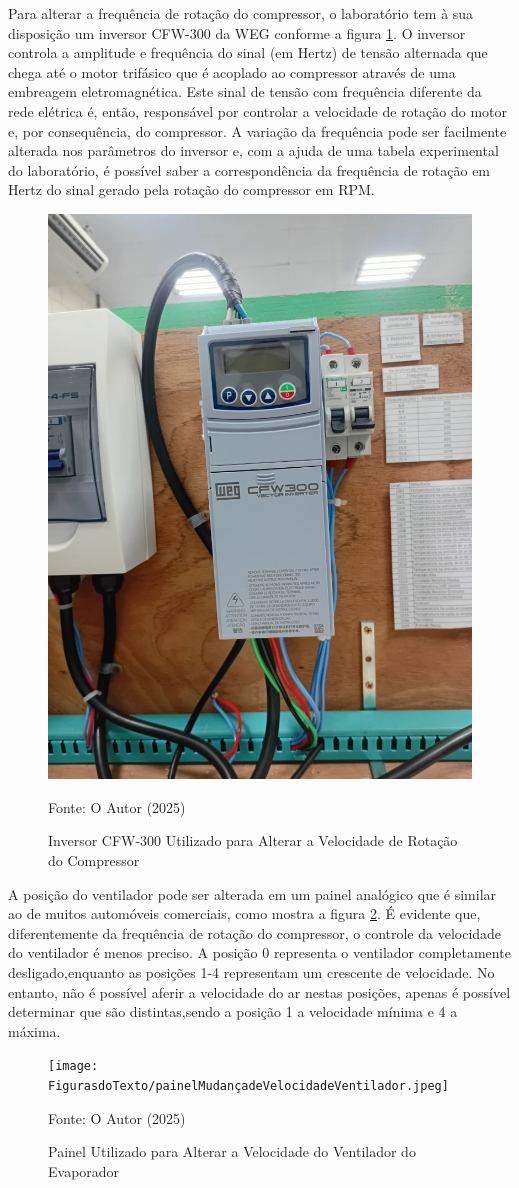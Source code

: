 Para alterar a frequência de rotação do compressor, o laboratório \textcite{reve2023} tem à sua disposição um inversor CFW-300 da WEG conforme a figura \ref{fig:inversor CFW-300}. O inversor controla a amplitude e frequência do sinal (em Hertz) de tensão alternada que chega até o motor trifásico que é acoplado ao compressor através de uma embreagem eletromagnética. Este sinal de tensão com frequência diferente da rede elétrica é, então, responsável por controlar a velocidade de rotação do motor e, por consequência, do compressor. A variação da frequência pode ser facilmente alterada nos parâmetros do inversor e, com a ajuda de uma tabela experimental do laboratório, é possível saber a correspondência da frequência de rotação em Hertz do sinal gerado pela rotação do compressor em RPM.

\begin{figure}[h]
    \centering
    \includegraphics[width=0.45\linewidth]{FigurasdoTexto/inversorcfw-300.jpeg}
    \caption{Inversor CFW-300 Utilizado para Alterar a Velocidade de Rotação do Compressor}
    \label{fig:inversor CFW-300}
    {\footnotesize Fonte: O Autor (2025)}
\end{figure}

A posição do ventilador pode ser alterada em um painel analógico que é similar ao de muitos automóveis comerciais, como mostra a figura \ref{fig:painelMudançadeVelocidadeVentilador}. É evidente que, diferentemente da frequência de rotação do compressor, o controle da velocidade do ventilador é menos preciso. A posição 0 representa o ventilador completamente desligado,enquanto as posições 1-4 representam um crescente de velocidade. No entanto, não é possível aferir a velocidade do ar nestas posições, apenas é possível determinar que são distintas,sendo a posição 1 a velocidade mínima e 4 a máxima. 
\newpage
\begin{figure}[h]
    \centering
    \texttt{[image: FigurasdoTexto/painelMudançadeVelocidadeVentilador.jpeg]}
    \caption{Painel Utilizado para Alterar a Velocidade do Ventilador do Evaporador}
    \label{fig:painelMudançadeVelocidadeVentilador}

    {\footnotesize Fonte: O Autor (2025)}

\end{figure}

